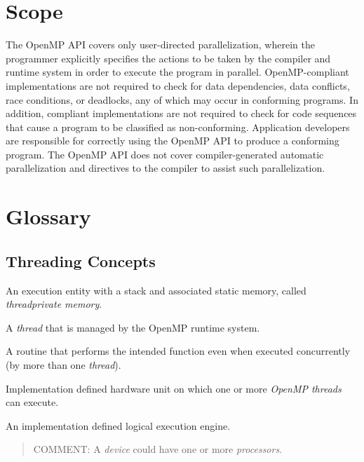 \section{Scope}
\label{sec:Scope}
The OpenMP API covers only user-directed parallelization, wherein the programmer 
explicitly specifies the actions to be taken by the compiler and runtime system in order 
to execute the program in parallel. OpenMP-compliant implementations are not required 
to check for data dependencies, data conflicts, race conditions, or deadlocks, any of 
which may occur in conforming programs. In addition, compliant implementations are 
not required to check for code sequences that cause a program to be classified as 
non-conforming. Application developers are responsible for correctly using the OpenMP API 
to produce a conforming program. The OpenMP API does not cover compiler-generated 
automatic parallelization and directives to the compiler to assist such parallelization.







\section{Glossary}
\label{sec:Glossary}
\subsection{Threading Concepts}
\label{subsec:Threading Concepts}
\glossarydefstart
An execution entity with a stack and associated static memory, called 
\emph{threadprivate memory}.
\glossarydefend

\glossarydefstart
A \emph{thread} that is managed by the OpenMP runtime system.
\glossarydefend

\glossarydefstart
A routine that performs the intended function even when executed concurrently 
(by more than one \emph{thread}).
\glossarydefend

\glossarydefstart
Implementation defined hardware unit on which one or more \emph{OpenMP threads} can 
execute.
\glossarydefend

\glossarydefstart
An implementation defined logical execution engine.

\begin{quote}
COMMENT: A \emph{device} could have one or more \emph{processors}.
\end{quote}
\glossarydefend

